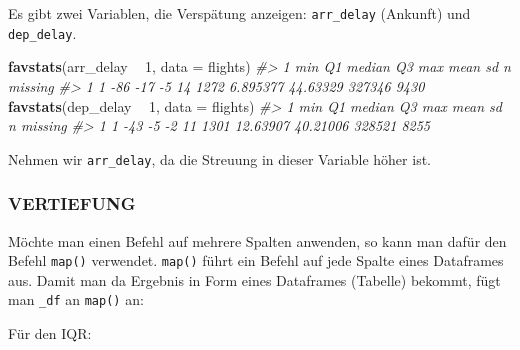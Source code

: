 \documentclass[]{article}
\newenvironment{Shaded}{\begin{snugshade}}{\end{snugshade}}
\newcommand{\CommentTok}[1]{\textcolor[rgb]{0.56,0.35,0.01}{\textit{#1}}}
\newcommand{\DataTypeTok}[1]{\textcolor[rgb]{0.13,0.29,0.53}{#1}}
\newcommand{\DecValTok}[1]{\textcolor[rgb]{0.00,0.00,0.81}{#1}}
\newcommand{\KeywordTok}[1]{\textcolor[rgb]{0.13,0.29,0.53}{\textbf{#1}}}
\newcommand{\NormalTok}[1]{#1}
\newcommand{\OperatorTok}[1]{\textcolor[rgb]{0.81,0.36,0.00}{\textbf{#1}}}
\newcommand{\StringTok}[1]{\textcolor[rgb]{0.31,0.60,0.02}{#1}}
\begin{document}
Es gibt zwei Variablen, die Verspätung anzeigen: \texttt{arr\_delay}
(Ankunft) und \texttt{dep\_delay}.

\begin{Shaded}
\begin{Highlighting}[]
\KeywordTok{favstats}\NormalTok{(arr_delay }\OperatorTok{~}\StringTok{ }\DecValTok{1}\NormalTok{, }\DataTypeTok{data =}\NormalTok{ flights)}
\CommentTok{#>   1 min  Q1 median Q3  max     mean       sd      n missing}
\CommentTok{#> 1 1 -86 -17     -5 14 1272 6.895377 44.63329 327346    9430}
\KeywordTok{favstats}\NormalTok{(dep_delay }\OperatorTok{~}\StringTok{ }\DecValTok{1}\NormalTok{, }\DataTypeTok{data =}\NormalTok{ flights)}
\CommentTok{#>   1 min Q1 median Q3  max     mean       sd      n missing}
\CommentTok{#> 1 1 -43 -5     -2 11 1301 12.63907 40.21006 328521    8255}
\end{Highlighting}
\end{Shaded}

Nehmen wir \texttt{arr\_delay}, da die Streuung in dieser Variable höher
ist.

\hypertarget{vertiefung}{%
\subsubsection{VERTIEFUNG}\label{vertiefung}}

Möchte man einen Befehl auf mehrere Spalten anwenden, so kann man dafür
den Befehl \texttt{map()} verwendet. \texttt{map()} führt ein Befehl auf
jede Spalte eines Dataframes aus. Damit man da Ergebnis in Form eines
Dataframes (Tabelle) bekommt, fügt man \texttt{\_df} an \texttt{map()}
an:

\begin{Shaded}
\end{Shaded}

Für den IQR:

\begin{Shaded}
\end{Shaded}
\end{document}
